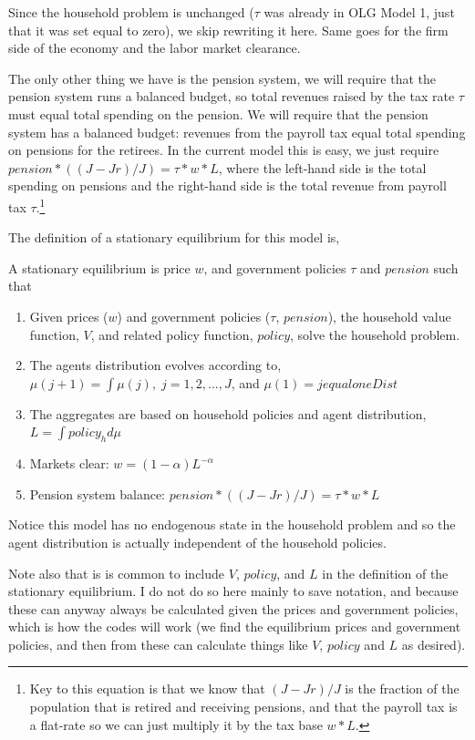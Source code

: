 Since the household problem is unchanged ($\tau$ was already in OLG Model 1, just that it was set equal to zero), we skip rewriting it here. Same goes for the firm side of the economy and the labor market clearance.

The only other thing we have is the pension system, we will require that the pension system runs a balanced budget, so total revenues raised by the tax rate $\tau$ must equal total spending on the pension. We will require that the pension system has a balanced budget: revenues from the payroll tax equal total spending on pensions for the retirees. In the current model this is easy, we just require $pension*((J-Jr)/J)=\tau*w*L$, where the left-hand side is the total spending on pensions and the right-hand side is the total revenue from payroll tax $\tau$.\footnote{Key to this equation is that we know that $(J-Jr)/J$ is the fraction of the population that is retired and receiving pensions, and that the payroll tax is a flat-rate so we can just multiply it by the tax base $w*L$.}

The definition of a stationary equilibrium for this model is,
\begin{definition}
 A stationary equilibrium is price $w$, and government policies $\tau$ and $pension$ such that
 \begin{enumerate}
  \item Given prices ($w$) and government policies ($\tau$, $pension$), the household value function, $V$, and related policy function, $policy$, solve the household problem.
  \item The agents distribution evolves according to,
   \\  $\mu(j+1)=\int \mu(j), \; j=1,2,...,J$, and $\mu(1)=jequaloneDist$
  \item The aggregates are based on household policies and agent distribution,
   \\  $L=\int policy_h d\mu$
  \item Markets clear: $w=(1-\alpha)L^{-\alpha}$
  \item Pension system balance: $pension*((J-Jr)/J)=\tau*w*L$
 \end{enumerate}
\end{definition}
Notice this model has no endogenous state in the household problem and so the agent distribution is actually independent of the household policies.

Note also that is is common to include $V$, $policy$, and $L$ in the definition of the stationary equilibrium. I do not do so here mainly to save notation, and because these can anyway always be calculated given the prices and government policies, which is how the codes will work (we find the equilibrium prices and government policies, and then from these can calculate things like $V$, $policy$ and $L$ as desired).

